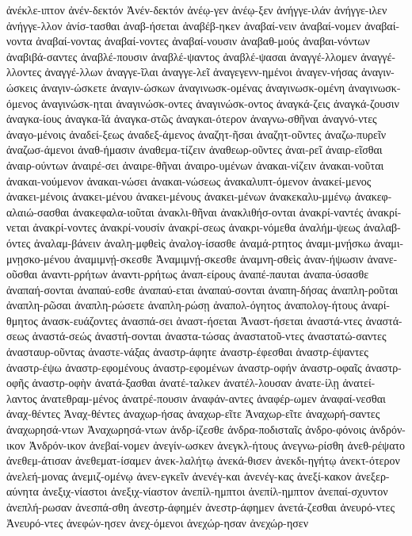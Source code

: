 {ἀνέκλε-ιπτον
ἀνέν-δεκτόν
Ἀνέν-δεκτόν
ἀνέῳ-γεν
ἀνέῳ-ξεν
ἀνήγγε-ιλάν
ἀνήγγε-ιλεν
ἀνήγγε-λλον
ἀνίσ-τασθαι
ἀναβ-ήσεται
ἀναβέβ-ηκεν
ἀναβαί-νειν
ἀναβαί-νομεν
ἀναβαί-νοντα
ἀναβαί-νοντας
ἀναβαί-νοντες
ἀναβαί-νουσιν
ἀναβαθ-μούς
ἀναβαι-νόντων
ἀναβιβά-σαντες
ἀναβλέ-πουσιν
ἀναβλέ-ψαντος
ἀναβλέ-ψασαι
ἀναγγέ-λλομεν
ἀναγγέ-λλοντες
ἀναγγέ-λλων
ἀναγγε-ῖλαι
ἀναγγε-λεῖ
ἀναγεγενν-ημένοι
ἀναγεν-νήσας
ἀναγιν-ώσκεις
ἀναγιν-ώσκετε
ἀναγιν-ώσκων
ἀναγινωσκ-ομένας
ἀναγινωσκ-ομένη
ἀναγινωσκ-όμενος
ἀναγινώσκ-ηται
ἀναγινώσκ-οντες
ἀναγινώσκ-οντος
ἀναγκά-ζεις
ἀναγκά-ζουσιν
ἀναγκα-ίους
ἀναγκα-ῖά
ἀναγκα-στῶς
ἀναγκαι-ότερον
ἀναγνω-σθῆναι
ἀναγνό-ντες
ἀναγο-μένοις
ἀναδεί-ξεως
ἀναδεξ-άμενος
ἀναζητ-ῆσαι
ἀναζητ-οῦντες
ἀναζω-πυρεῖν
ἀναζωσ-άμενοι
ἀναθ-ήμασιν
ἀναθεμα-τίζειν
ἀναθεωρ-οῦντες
ἀναι-ρεῖ
ἀναιρ-εῖσθαι
ἀναιρ-ούντων
ἀναιρέ-σει
ἀναιρε-θῆναι
ἀναιρο-υμένων
ἀνακαι-νίζειν
ἀνακαι-νοῦται
ἀνακαι-νούμενον
ἀνακαι-νώσει
ἀνακαι-νώσεως
ἀνακαλυπτ-όμενον
ἀνακεί-μενος
ἀνακει-μένοις
ἀνακει-μένου
ἀνακει-μένους
ἀνακει-μένων
ἀνακεκαλυ-μμένῳ
ἀνακεφ-αλαιώ-σασθαι
ἀνακεφαλα-ιοῦται
ἀνακλι-θῆναι
ἀνακλιθήσ-ονται
ἀνακρί-ναντές
ἀνακρί-νεται
ἀνακρί-νοντες
ἀνακρί-νουσίν
ἀνακρί-σεως
ἀνακρι-νόμεθα
ἀναλήμ-ψεως
ἀναλαβ-όντες
ἀναλαμ-βάνειν
ἀναλη-μφθεὶς
ἀναλογ-ίσασθε
ἀναμά-ρτητος
ἀναμι-μνῄσκω
ἀναμι-μνῃσκο-μένου
ἀναμιμνῄ-σκεσθε
Ἀναμιμνῄ-σκεσθε
ἀναμνη-σθεὶς
ἀναν-ήψωσιν
ἀνανε-οῦσθαι
ἀναντι-ρρήτων
ἀναντι-ρρήτως
ἀναπ-είρους
ἀναπέ-παυται
ἀναπα-ύσασθε
ἀναπαή-σονται
ἀναπαύ-εσθε
ἀναπαύ-εται
ἀναπαύ-σονται
ἀναπη-δήσας
ἀναπλη-ροῦται
ἀναπλη-ρῶσαι
ἀναπλη-ρώσετε
ἀναπλη-ρώσῃ
ἀναπολ-όγητος
ἀναπολογ-ήτους
ἀναρί-θμητος
ἀνασκ-ευάζοντες
ἀνασπά-σει
ἀναστ-ήσεται
Ἀναστ-ήσεται
ἀναστά-ντες
ἀναστά-σεως
ἀναστά-σεώς
ἀναστή-σονται
ἀναστα-τώσας
ἀναστατοῦ-ντες
ἀναστατώ-σαντες
ἀνασταυρ-οῦντας
ἀναστε-νάξας
ἀναστρ-άφητε
ἀναστρ-έφεσθαι
ἀναστρ-έψαντες
ἀναστρ-έψω
ἀναστρ-εφομένους
ἀναστρ-εφομένων
ἀναστρ-οφήν
ἀναστρ-οφαῖς
ἀναστρ-οφῆς
ἀναστρ-οφὴν
ἀνατά-ξασθαι
ἀνατέ-ταλκεν
ἀνατέλ-λουσαν
ἀνατε-ίλῃ
ἀνατεί-λαντος
ἀνατεθραμ-μένος
ἀνατρέ-πουσιν
ἀναφάν-αντες
ἀναφέρ-ωμεν
ἀναφαί-νεσθαι
ἀναχ-θέντες
Ἀναχ-θέντες
ἀναχωρ-ήσας
ἀναχωρ-εῖτε
Ἀναχωρ-εῖτε
ἀναχωρή-σαντες
ἀναχωρησά-ντων
Ἀναχωρησά-ντων
ἀνδρ-ίζεσθε
ἀνδρα-ποδισταῖς
ἀνδρο-φόνοις
ἀνδρόν-ικον
Ἀνδρόν-ικον
ἀνεβαί-νομεν
ἀνεγίν-ωσκεν
ἀνεγκλ-ήτους
ἀνεγνω-ρίσθη
ἀνεθ-ρέψατο
ἀνεθεμ-άτισαν
ἀνεθεματ-ίσαμεν
ἀνεκ-λαλήτῳ
ἀνεκά-θισεν
ἀνεκδι-ηγήτῳ
ἀνεκτ-ότερον
ἀνελεή-μονας
ἀνεμιζ-ομένῳ
ἀνεν-εγκεῖν
ἀνενέγ-και
ἀνενέγ-κας
ἀνεξί-κακον
ἀνεξερ-αύνητα
ἀνεξιχ-νίαστοι
ἀνεξιχ-νίαστον
ἀνεπίλ-ημπτοι
ἀνεπίλ-ημπτον
ἀνεπαί-σχυντον
ἀνεπλή-ρωσαν
ἀνεσπά-σθη
ἀνεστρ-άφημέν
ἀνεστρ-άφημεν
ἀνετά-ζεσθαι
ἀνευρό-ντες
Ἀνευρό-ντες
ἀνεφών-ησεν
ἀνεχ-όμενοι
ἀνεχώρ-ησαν
ἀνεχώρ-ησεν
}
